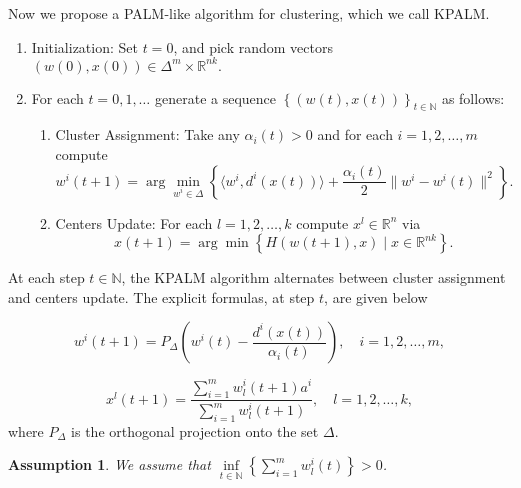 \documentclass[11pt]{article}
\numberwithin{equation}{section}
\newtheorem{assumption}{Assumption}
\begin{document}
Now we propose a PALM-like algorithm for clustering, which we call KPALM.
\begin{enumerate}[(1)]
	\item Initialization: Set $t=0$, and pick random vectors $(w(0),x(0)) \in \Delta^m \times \mathbb{R}^{nk} .$

	\item For each $t=0,1, \ldots$ generate a sequence $\left\lbrace(w(t),x(t))\right\rbrace_{t \in \mathbb{N}}$ as follows:
	\begin{enumerate}[(2.1)]
		\item Cluster Assignment: Take any $\alpha_i(t) > 0$ and for each $i=1, 2, \ldots ,m$ compute
		\begin{equation}
			w^i(t+1) = \arg\min\limits_{w^i \in \Delta} \left\lbrace \langle w^i , d^i(x(t)) \rangle + \frac{\alpha_i(t)}{2} \|w^i - w^i(t)\|^2 \right\rbrace . \label{StateEq5}
		\end{equation}
		
		\item Centers Update: For each $l=1, 2, \ldots ,k$ compute $x^l \in \mathbb{R}^n$ via
		\begin{equation}
			x(t+1) = \arg\min \left\lbrace H(w(t+1), x) \mid x \in \mathbb{R}^{nk} \right\rbrace . \label{StateEq6}
		\end{equation}
	\end{enumerate}
\end{enumerate}

\newpage

At each step $t \in \mathbb{N}$, the KPALM algorithm alternates between cluster assignment and centers update. The explicit formulas, at step $t$, are given below

\begin{equation}
w^i(t+1) = P_{\Delta} \left(w^i(t) - \frac{d^i(x(t))}{\alpha_i(t)}\right) , \quad i=1, 2, \ldots ,m , \label{StateEq7}
\end{equation}

\begin{equation}
x^l(t+1) = \frac{\sum_{i=1}^{m} w^i_l(t+1) a^i}{\sum_{i=1}^{m} w^i_l(t+1)} , \quad l=1, 2, \ldots ,k , \label{StateEq8}
\end{equation}
where $P_{\Delta}$ is the orthogonal projection onto the set $\Delta$.

\begin{assumption} \label{StateEq17}
We assume that $\inf\limits_{t \in \mathbb{N}} \left\lbrace \sum\limits_{i=1}^{m} w^i_l(t) \right\rbrace > 0$.
\end{assumption}
	
\end{document}
